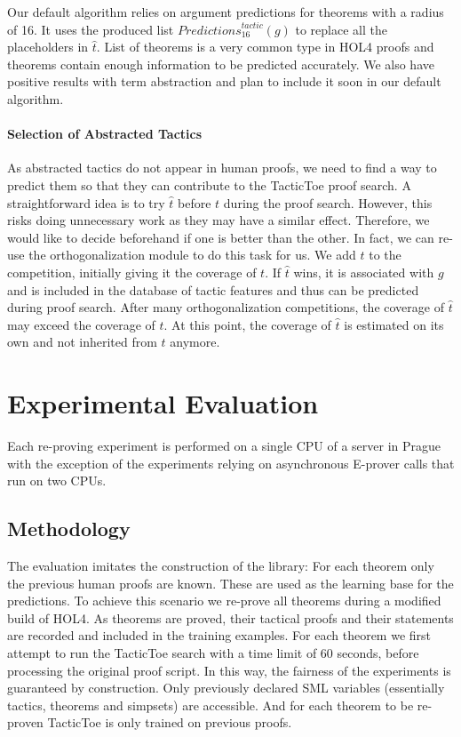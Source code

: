 \documentclass[runningheads,a4paper,draft]{svjour3}
\def\holfour{\textsf{HOL4}\xspace}
\def\eprover{\textsf{E-prover}\xspace}
\def\sml{\textsf{SML}\xspace}
\def\tactictoe{\textsf{TacticToe}\xspace}
\begin{document}
Our default algorithm relies on argument predictions for theorems with a 
radius of 16. It uses the produced list 
$\mathit{Predictions}^{\mathit{tactic}}_{16}(g)$ to replace all the 
placeholders 
in $\hat{t}$. 
List of theorems is a very common type in \holfour proofs and theorems contain 
enough information to be predicted accurately.
We also have positive results with term abstraction and plan to include it soon 
in our default algorithm.

\paragraph{Selection of Abstracted Tactics}
As abstracted tactics do not appear in human proofs, we need to find a way to
predict them so that they can contribute to the \tactictoe proof search.
A straightforward idea is to try $\hat{t}$ before $t$ during the proof search.
However, this risks doing unnecessary work as they may have a similar effect.
Therefore, we would like to decide
beforehand if one is better than the other.
In fact, we can re-use the orthogonalization module to do this task for us.
We add $\hat{t}$ to the competition, initially giving it the coverage of $t$.
If $\hat{t}$
wins, it is associated with $g$ and is included in the database of tactic
features and thus can be predicted during proof search.
After many orthogonalization competitions, the coverage of $\hat{t}$ may exceed 
the coverage of
$t$. At
this point, the coverage of $\hat{t}$ is estimated on its own and not inherited
from
$t$ anymore.




\section{Experimental Evaluation}\label{s:experiments}
Each re-proving experiment is performed on a single CPU of a server in Prague
with the exception of the experiments
relying on asynchronous \eprover calls that run on two CPUs.


\subsection{Methodology}
The evaluation imitates the construction of the library: For each theorem only
the previous human proofs are known. These are used as the learning base for
the predictions.
To achieve this scenario we re-prove all theorems during a modified build of
\holfour.
As theorems are proved, their tactical proofs and their statements are
recorded and included in the training examples.
For each theorem we first attempt to run the \tactictoe search with a time
limit of 60 seconds, before processing the original proof script.
In this way, the fairness of the experiments is guaranteed by construction.
Only previously declared \sml
variables (essentially tactics, theorems and simpsets) are accessible.
And for each theorem to be re-proven \tactictoe is only trained on previous
proofs.
\end{document}
